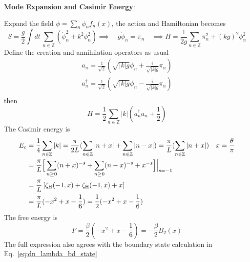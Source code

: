 \documentclass{article}
\begin{document}
{\bf Mode Expansion and Casimir Energy}:

Expand the field $\phi = \sum_n \phi_n f_n(x) $, the action and Hamiltonian becomes
\begin{equation}
  S = \frac{g}{2} \int dt \, \sum_{n \in \mathbb{Z} }\left(  \dot{\phi}^2_n + k^2 \phi_n^2 \right) \implies\quad   g \dot{\phi}_n  = \pi_n \quad \implies H =  
\frac{1}{2g}\sum_{n \in \mathbb{Z} } \pi_n^2 + ( kg )^2  \phi_n^2 
\end{equation}
Define the creation and annihilation operators as usual
\begin{equation}
\begin{aligned}
a_n = \frac{1}{\sqrt{2}} ( \sqrt{ |k|g} \phi_n + \frac{i }{\sqrt{|k|g} }\pi_n  ) \\
a^{\dagger}_n = \frac{1}{\sqrt{2}} ( \sqrt{ |k|g} \phi_n - \frac{i }{\sqrt{|k|g} }\pi_n  ) \\
\end{aligned}
\end{equation}
then
\begin{equation}
H = \frac{1}{2} \sum_{n \in \mathbb{Z} } |k|  (a^{\dagger}_n a_n + \frac{1}{2} )
\end{equation}
The Casimir energy is 
\begin{equation}
\begin{aligned}
E_c &= \frac{1}{4} \sum_{n \in \mathbb{Z}} | k| = \frac{\pi}{2L} ( \sum_{n \in \mathbb{Z}}  | n + x | + \sum_{n \in \mathbb{Z}}  | n - x |  )  = \frac{\pi}{L} ( \sum_{n \in \mathbb{Z}}  | n + x |  )\quad x = \frac{\theta}{\pi}\\  
&= \frac{\pi}{L} \Big[\sum_{n \ge 0 } ( n + x )^{-s} + \sum_{n \ge 0 }  ( n - x)^{-s}  +   x^{-s} \Big]\Big|_{s = -1} \\
&= \frac{\pi}{L} \left[ \zeta_{\rm H}( -1, x ) + \zeta_{\rm H}( -1, x ) +  x \right] \\
&= \frac{\pi}{L} ( - x^2 + x - \frac{1}{6})  = \frac{1}{2} ( - x^2 + x - \frac{1}{6})
\end{aligned}
\end{equation}
The free energy is
\begin{equation}
F = \frac{\beta}{2} ( - x^2 + x - \frac{1}{6}) = - \frac{\beta}{2} B_2( x) 
\end{equation}
The full expression also agrees with the boundary state calculation in Eq.~\ref{eq:dn_lambda_bd_state}


\end{document}
